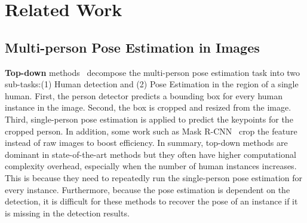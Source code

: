 \documentclass[runningheads]{llncs}
\begin{document}
	\section{Related Work}
	\label{sec:related_work}
	
	\subsection{Multi-person Pose Estimation in Images}
	\textbf{Top-down} methods~\cite{chen2018cascaded,fang2017rmpe,he2017mask,huang2017coarse,li2019crowdpose,liu2018cascaded,papandreou2017towards,sun2019deep,xiao2018simple} decompose the multi-person pose estimation task into two sub-tasks:(1) Human detection and (2) Pose Estimation in the region of a single human. 
	First, the person detector predicts a bounding box for every human instance in the image. Second, the box is cropped and resized from the image. Third, single-person pose estimation is applied to predict the keypoints for the cropped person. 
	In addition, some work such as Mask R-CNN~\cite{he2017mask} crop the feature instead of raw images to boost efficiency. 
	In summary, top-down methods are dominant in state-of-the-art methods but they often have higher computational complexity overhead, especially when the number of human instances increases. This is because they need to repeatedly run the single-person pose estimation for every instance. Furthermore, because the pose estimation is dependent on the detection, it is difficult for these methods to recover the pose of an instance if it is missing in the detection results.
	
\end{document}
